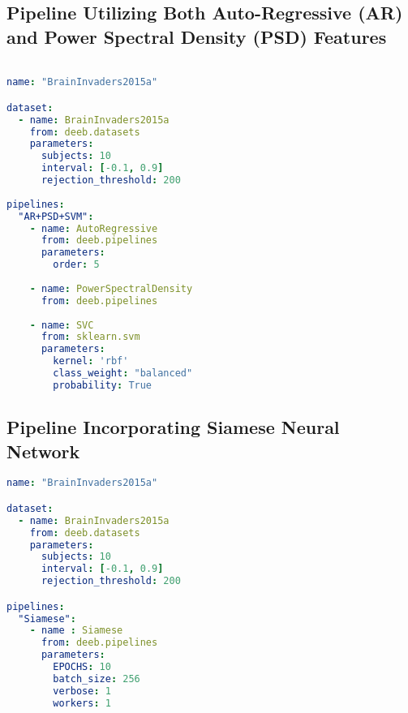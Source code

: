 \subsection{Pipeline Utilizing Both Auto-Regressive (AR) and Power Spectral Density (PSD) Features}
\begin{lstlisting}[language=YAML, style=customyaml, caption={Benchamrking pipeline for dataset BrainInvaders15a with AR and PSD features with classifier SVM}, label={lst:yaml}]

name: "BrainInvaders2015a"

dataset:
  - name: BrainInvaders2015a
    from: deeb.datasets
    parameters:
      subjects: 10
      interval: [-0.1, 0.9]
      rejection_threshold: 200
      
pipelines:
  "AR+PSD+SVM":
    - name: AutoRegressive
      from: deeb.pipelines
      parameters:
        order: 5
      
    - name: PowerSpectralDensity
      from: deeb.pipelines
      
    - name: SVC
      from: sklearn.svm
      parameters:
        kernel: 'rbf'
        class_weight: "balanced"
        probability: True
\end{lstlisting}


\subsection{Pipeline Incorporating Siamese Neural Network}
\begin{lstlisting}[language=YAML, style=customyaml, caption={Benchamrking pipeline for dataset BrainInvaders15a with Siamese Networks}, label={lst:yaml}]
name: "BrainInvaders2015a"

dataset: 
  - name: BrainInvaders2015a
    from: deeb.datasets
    parameters: 
      subjects: 10
      interval: [-0.1, 0.9]
      rejection_threshold: 200

pipelines:
  "Siamese": 
    - name : Siamese
      from: deeb.pipelines
      parameters: 
        EPOCHS: 10
        batch_size: 256
        verbose: 1
        workers: 1
\end{lstlisting}

